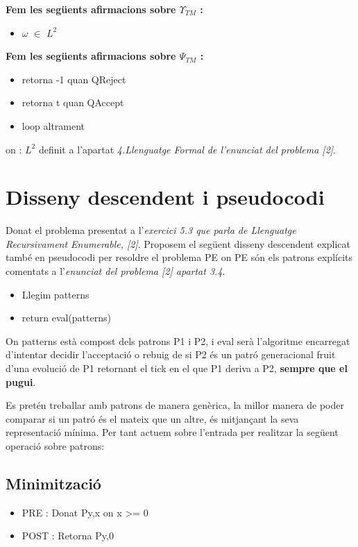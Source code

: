 \documentclass[12pt,a4paper]{report}
\def \w{$\omega$}
\def \preTM{$\Upsilon_{TM}$}
\def \postTM{$\Psi_{TM}$}
\begin{document}
\textbf{Fem les següents afirmacions sobre \preTM{} :}

\begin{itemize}
\item \w{} $\in$ $L^2$
\end{itemize}

\textbf{Fem les següents afirmacions sobre \postTM{} :}

\begin{itemize}
\item retorna -1 quan QReject
\item retorna t quan QAccept
\item loop altrament
\end{itemize}

on : $L^2$ definit a l'apartat \textit{4.Llenguatge Formal de l'enunciat del problema [2]}.

\section{Disseny descendent i pseudocodi}

Donat el problema presentat a l’\textit{exercici 5.3 que parla de Llenguatge Recursivament Enumerable, [2]}. Proposem el següent disseny descendent explicat també en pseudocodi per resoldre el problema PE on PE són els patrons explícits comentats a l'\textit{enunciat del problema [2] apartat 3.4}.

\begin{itemize}
\item Llegim patterns
\item return eval(patterns)
\end{itemize}

On patterns està compost dels patrons P1 i P2, i eval serà l'algoritme encarregat d'intentar decidir l'acceptació o rebuig de si P2 és un patró generacional fruit d'una evolució de P1 retornant el tick en el que P1 deriva a P2, \textbf{sempre que el pugui}.

Es pretén treballar amb patrons de manera genèrica, la millor manera de poder comparar si un patró és el mateix que un altre, és mitjançant la seva representació mínima. Per tant actuem sobre l’entrada per realitzar la següent operació sobre patrons:

\subsection{Minimització}

\begin{itemize}
\item PRE : Donat Py,x on x >= 0
\item POST : Retorna Py,0
\end{itemize}
\end{document}
